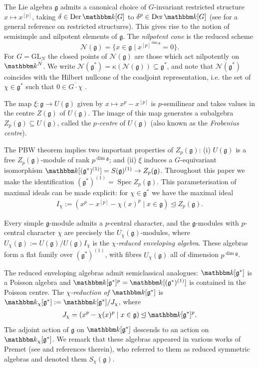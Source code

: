 \documentclass[twoside,12pt,reqno]{amsart}
\theoremstyle{remark}
\numberwithin{equation}{section}
\def\k{{\mathbbm k}}
\def\Der{\operatorname{Der}}
\def\Spec{\operatorname{Spec}}
\def\GL{\mathrm{GL}}
\def\g{{\mathfrak g}}
\newcommand{\Nc}{\mathcal{N}}
\begin{document}
The Lie algebra $\g$ admits a canonical choice of $G$-invariant restricted structure $x \mapsto x^{[p]}$, taking $\delta\in\Der \k[G]$ to $\delta^p\in\Der \k[G]$ (see \cite[]{SF80} for a general reference on restricted structures). This gives rise to the notion of semisimple and nilpotent elements of $\g$. The {\em nilpotent cone} is the reduced scheme
$$\Nc(\g) = \{x \in \g \mid x^{[p]^{\dim \g}} = 0\}.$$
For $G = \GL_N$ the closed points of $\Nc(\g)$ are those which act nilpotently on $\k^N$. 
We write $\Nc(\g^*) = \kappa (\Nc(\g) ) \subseteq \g^*$, and note that $\Nc(\g^*)$ coincides with the Hilbert nullcone of the coadjoint representation, i.e. the set of $\chi \in \g^*$ such that $0 \in \overline{G\cdot \chi}$ \cite{PrKR}.

The map $\xi:\g\to U(\g)$ given by $x\mapsto x^p - x^{[p]}$ is $p$-semilinear and takes values in the centre $Z(\g)$ of $U(\g)$. The image of this map generates a subalgebra $Z_p(\g) \subseteq U(\g)$, called the {\it $p$-centre} of $U(\g)$ (also known as the {\it Frobenius centre}).

The PBW theorem implies two important properties of $Z_p(\g)$: (i) $U(\g)$ is a free $Z_p(\g)$-module of rank $p^{\dim \g}$; and (ii) $\xi$ induces a $G$-equivariant isomorphism $\k[(\g^*)^{(1)}] = S(\g)^{(1)} \to Z_p(\g)$. Throughout this paper we make the identification $(\g^*)^{(1)} = \Spec Z_p(\g)$. This parameterisation of maximal ideals can be made explicit: for $\chi \in \g^*$ we have the maximal ideal 
\begin{eqnarray}
    \label{eq:idealIchi}
    I_\chi := (x^p - x^{[p]} -\chi(x)^p \mid x\in \g) \unlhd Z_p(\g).
\end{eqnarray}

Every simple $\g$-module admits a $p$-central character, and the $\g$-modules with $p$-central character $\chi$ are precisely the $U_\chi(\g)$-modules, where  $U_\chi(\g) := U(\g) / U(\g) I_\chi$ is the {\em $\chi$-reduced enveloping algebra}. These algebras form a flat family over $(\g^*)^{(1)}$, with fibres $U_\chi(\g)$ all of dimension $p^{\dim \g}$.

The reduced enveloping algebras admit semiclassical analogues: $\k[\g^*]$ is a Poisson algebra and $\k[\g^*]^p = \k[(\g^*)^{(1)}]$ is contained in the Poisson centre. The {\it $\chi$-reduction of} $\k[\g^*]$ is $\k_\chi[\g^*] := \k[\g^*] / J_\chi$, where
\begin{eqnarray}
\label{eq:idealJchi}
J_\chi = (x^p - \chi(x)^p \mid x\in \g)\unlhd \k[\g^*]^p.    
\end{eqnarray}
The adjoint action of $\g$ on $\k[\g^*]$ descends to an action on $\k_\chi[\g^*]$. We remark that these algebras appeared in various works of Premet (see \cite{PSk} and references therein), who referred to them as reduced symmetric algebras and denoted them $S_\chi(\g)$.
\end{document}
